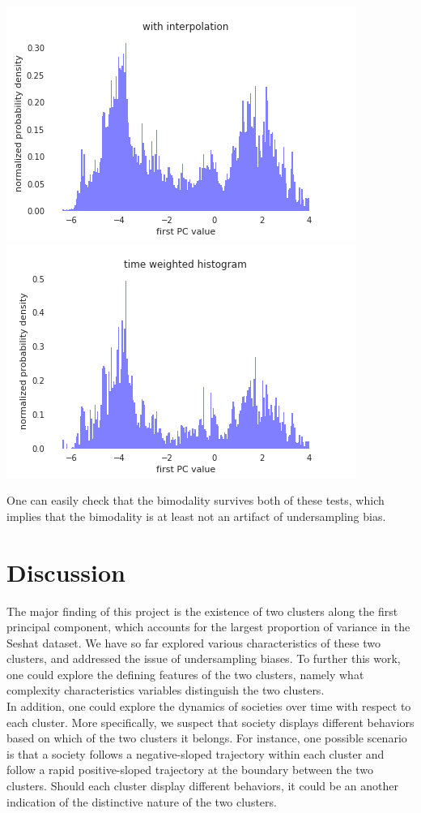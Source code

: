 \documentclass[11pt]{article}
\begin{document}
\begin{center}
	\includegraphics[scale=0.50]{interpolation.png}
	\includegraphics[scale=0.50]{time_weighted.png}
\end{center}

One can easily check that the bimodality survives both of these tests, which implies that the bimodality is at least not an artifact of undersampling bias. 

\section{Discussion}

The major finding of this project is the existence of two clusters along the first principal component, which accounts for the largest proportion of variance in the Seshat dataset. We have so far explored various characteristics of these two clusters, and addressed the issue of undersampling biases. To further this work, one could explore the defining features of the two clusters, namely what complexity characteristics variables distinguish the two clusters.\\
 In addition, one could explore the dynamics of societies over time with respect to each cluster. More specifically, we suspect that society displays different behaviors based on which of the two clusters it belongs. For instance, one possible scenario is that a society follows a negative-sloped trajectory within each cluster and follow a rapid positive-sloped trajectory at the boundary between the two clusters. Should each cluster display different behaviors, it could be an another indication of the distinctive nature of the two clusters.  
\end{document}
